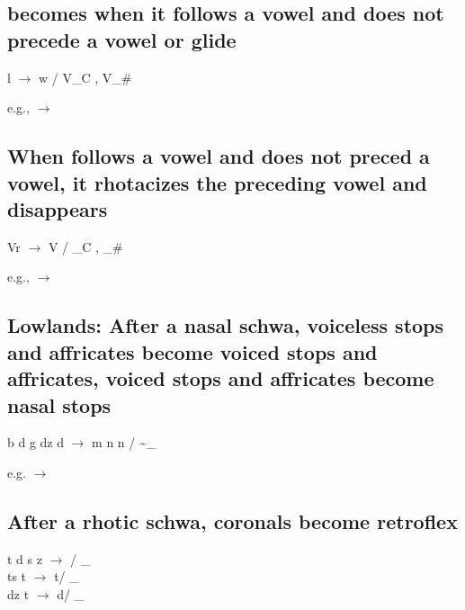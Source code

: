 
\subsection{ becomes  when it follows a vowel and does not precede a vowel or glide}

\begin{center}
l $\to$ w / V\_C , V\_\#
\end{center}

e.g.,   $\to$ 

\subsection{When  follows a vowel and does not preced a vowel, it rhotacizes the preceding vowel and disappears}

\begin{center}
    Vr $\to$ V\rhot{} / \_C , \_\#
\end{center}

e.g.,   $\to$ 

\subsection{{\sc Lowlands:} After a nasal schwa, voiceless stops and affricates become voiced stops and affricates, voiced stops and affricates become nasal stops}

\begin{center}
    b d \paljstop{} g d\tiebar z d\tiebar\ezh{} \glotstop{} $\to$ m n \egna{} \engma{} n \egna{} / \~{\schwa}\_
\end{center}

e.g.   $\to$ 

\subsection{After a rhotic schwa, coronals become retroflex}

\begin{center}
    t d s z $\to$ \rette{} \retde{} \retesh{} \retezh{} / \schwa\rhot\_ \\[0.1cm]
    t\tiebar s t\tiebar\esh{} $\to$ t\tiebar\retesh / \schwa\rhot\_ \\[0.1cm]
    d\tiebar z t\tiebar\ezh{} $\to$ d\tiebar\retezh / \schwa\rhot\_ 
\end{center}


